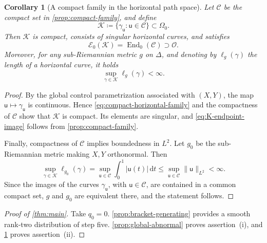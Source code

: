 \documentclass[11pt]{amsart}
\newtheorem{corollary}[theorem]{Corollary}
\numberwithin{equation}{section}
\theoremstyle{remark}
\newcommand{\dd}{\,\mathrm d}
\newcommand{\End}{\operatorname{End}}
\begin{document}
\begin{corollary}[A compact family in the horizontal path space]
\label{cor:compact-horizontal-family}
Let $\mathcal C$ be the compact set in
\cref{prop:compact-family}, and define
\begin{equation}\label{eq:compact-horizontal-family}
 \mathcal K\coloneq \{\gamma_\mathsf{u}:\mathsf{u}\in\mathcal C\}
 \subset\Omega_0.
\end{equation}
Then $\mathcal K$ is compact, consists of singular horizontal
curves, and satisfies
\begin{equation}\label{eq:K-endpoint-image}
 \mathcal E_0(\mathcal K)=\End_0(\mathcal C)\supset\mathcal O.
\end{equation}
Moreover, for any sub-Riemannian metric $g$ on $\Delta$, and denoting by
$\ell_g(\gamma)$ the length of a horizontal curve, it holds
\begin{equation}
 \sup_{\gamma\in\mathcal K}\ell_g(\gamma)<\infty.
\end{equation}
\end{corollary}

\begin{proof}
By the global control parametrization associated with $(X,Y)$, the map
$\mathsf{u}\mapsto\gamma_\mathsf{u}$ is continuous.  Hence
\eqref{eq:compact-horizontal-family} and the compactness of $\mathcal C$
show that $\mathcal K$ is compact.  Its elements are singular, and
\eqref{eq:K-endpoint-image} follows from
\cref{prop:compact-family}.

Finally, compactness of $\mathcal C$ implies boundedness in $L^2$.  Let
$g_0$ be the sub-Riemannian metric making $X,Y$ orthonormal.  Then
\begin{equation}
 \sup_{\gamma\in\mathcal K}\ell_{g_0}(\gamma)
 =\sup_{\mathsf{u}\in\mathcal C}\int_0^1|\mathsf{u}(t)|\dd t
 \leq\sup_{\mathsf{u}\in\mathcal C}\|\mathsf{u}\|_{L^2}<\infty.
\end{equation}
Since the images of the curves $\gamma_\mathsf{u}$, with $\mathsf{u}\in\mathcal C$, are
contained in a common compact set, $g$
and $g_0$ are equivalent there, and the statement follows.
\end{proof}

\begin{proof}[Proof of \cref{thm:main}]
Take $q_0=0$.  \cref{prop:bracket-generating} provides a smooth
rank-two distribution of step five.
\cref{prop:global-abnormal} proves assertion~\textup{(i)}, and
\cref{cor:compact-horizontal-family} proves assertion~\textup{(ii)}.
\end{proof}
\end{document}
